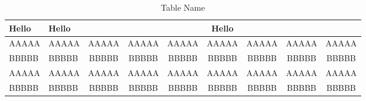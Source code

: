\begin{center}
\begin{table*}[ht]
{\small
\hfill{}
\begin{tabular}{|l|l|c|c|c|c|c|c|c|}
\hline
\textbf{Hello}&\textbf{Hello}& \multicolumn{7}{|c|}{\textbf{Hello}}\\
\cline{3-9}
\hline
AAAAA&AAAAA&AAAAA&AAAAA&AAAAA&AAAAA&AAAAA&AAAAA&AAAAA\\
BBBBB&BBBBB&BBBBB&BBBBB&BBBBB&BBBBB&BBBBB&BBBBB&BBBBB\\
AAAAA&AAAAA&AAAAA&AAAAA&AAAAA&AAAAA&AAAAA&AAAAA&AAAAA\\
BBBBB&BBBBB&BBBBB&BBBBB&BBBBB&BBBBB&BBBBB&BBBBB&BBBBB\\
\hline
\end{tabular}}
\hfill{}
\caption{Table Name}
\label{tb:tablename}
\end{table*}
\end{center}